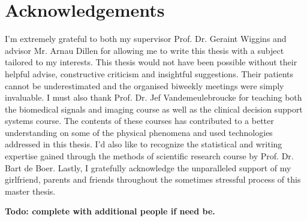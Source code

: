 
\chapter{Acknowledgements}
\label{ch:acknowledgements}

I'm extremely grateful to both my supervisor Prof. Dr. Geraint Wiggins and advisor Mr. Arnau Dillen for allowing me to write this thesis with a subject tailored to my interests.
This thesis would not have been possible without their helpful advise, constructive criticism and insightful suggestions.
Their patients cannot be underestimated and the organised biweekly meetings were simply invaluable.
I must also thank Prof. Dr. Jef Vandemeulebroucke for teaching both the biomedical signals and imaging course as well as the clinical decision support systems course.
The contents of these courses has contributed to a better understanding on some of the physical phenomena and used technologies addressed in this thesis.
I’d also like to recognize the statistical and writing expertise gained through the methods of scientific research course by Prof. Dr. Bart de Boer.
Lastly, I gratefully acknowledge the unparalleled support of my girlfriend, parents and friends throughout the sometimes stressful process of this master thesis.

\textbf{Todo: complete with additional people if need be.}